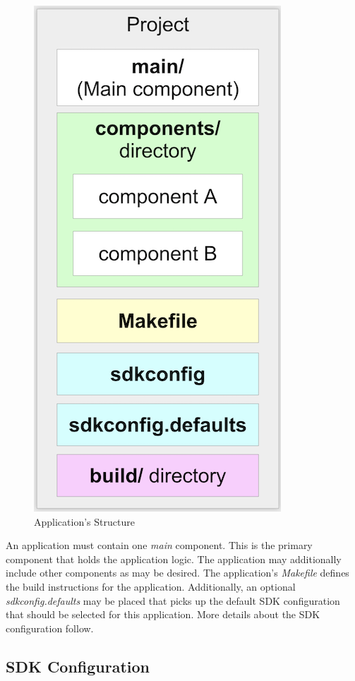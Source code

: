 \documentclass[main.tex]{subfiles}
\begin{document}
\begin{figure}[h!]
    \centering
    \includegraphics[scale=0.4]{../../_static/app_structure.png}
    \caption{Application's Structure}
    \label{fig:app_structure}
\end{figure}

An application must contain one \textit{main} component. This is the primary component that holds the application logic. The application may additionally include other components as may be desired.
The application's \textit{Makefile} defines the build instructions for the application. 
Additionally, an optional \textit{sdkconfig.defaults} may be placed that picks up the default SDK configuration that should be selected for this application. More details about the SDK configuration follow.

\subsection{SDK Configuration}
\end{document}
